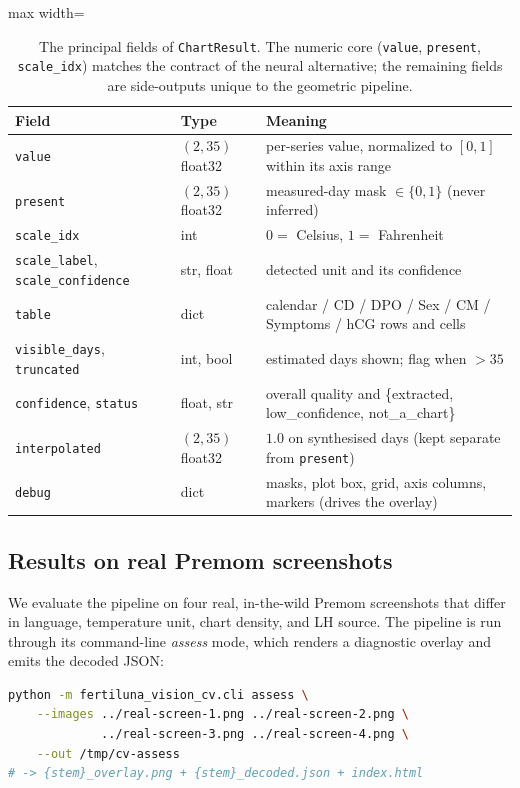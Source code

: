 \documentclass[11pt,a4paper]{article}
\newcommand{\code}[1]{\texttt{\small #1}}
\newcommand{\file}[1]{\texttt{\small\color{NavyBlue!70!black}#1}}
\begin{document}
\begin{table}[H]
\centering
\caption{The principal fields of \code{ChartResult}. The numeric core
(\code{value}, \code{present}, \code{scale\_idx}) matches the contract of the
neural alternative; the remaining fields are side-outputs unique to the
geometric pipeline.}
\label{tab:chartresult}
\small
\begin{adjustbox}{max width=\textwidth}
\begin{tabular}{@{}lll@{}}
\toprule
Field & Type & Meaning\\
\midrule
\code{value}        & $(2,35)$ float32 & per-series value, normalized to $[0,1]$ within its axis range\\
\code{present}      & $(2,35)$ float32 & measured-day mask $\in\{0,1\}$ (never inferred)\\
\code{scale\_idx}   & int              & $0=$ Celsius, $1=$ Fahrenheit\\
\code{scale\_label}, \code{scale\_confidence} & str, float & detected unit and its confidence\\
\code{table}        & dict             & calendar / CD / DPO / Sex / CM / Symptoms / hCG rows and cells\\
\code{visible\_days}, \code{truncated} & int, bool & estimated days shown; flag when $>35$\\
\code{confidence}, \code{status} & float, str & overall quality and \{extracted, low\_confidence, not\_a\_chart\}\\
\code{interpolated} & $(2,35)$ float32 & $1.0$ on synthesised days (kept separate from \code{present})\\
\code{debug}        & dict             & masks, plot box, grid, axis columns, markers (drives the overlay)\\
\bottomrule
\end{tabular}
\end{adjustbox}
\end{table}

\subsection{Results on real Premom screenshots}
\label{sec:cvresults}
We evaluate the pipeline on four real, in-the-wild Premom screenshots that differ
in language, temperature unit, chart density, and LH source. The pipeline is run
through its command-line \emph{assess} mode, which renders a diagnostic overlay
and emits the decoded JSON:
\begin{lstlisting}[language=bash,caption={Producing the diagnostic overlays from
real screenshots (run from \file{model/}).}]
python -m fertiluna_vision_cv.cli assess \
    --images ../real-screen-1.png ../real-screen-2.png \
             ../real-screen-3.png ../real-screen-4.png \
    --out /tmp/cv-assess
# -> {stem}_overlay.png + {stem}_decoded.json + index.html
\end{lstlisting}
\end{document}
